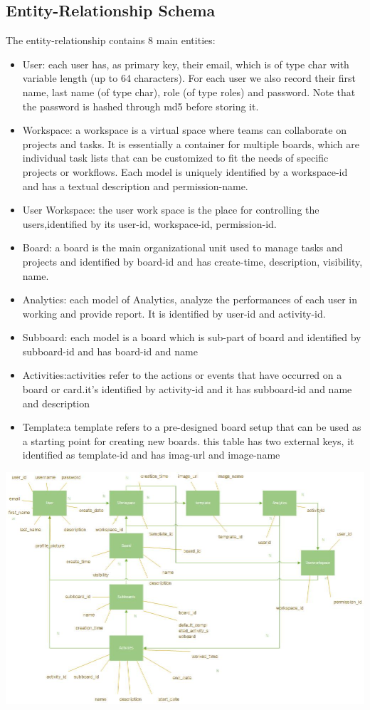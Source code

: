 \subsection{Entity-Relationship Schema}


\noindent The entity-relationship contains 8 main entities:
\begin{itemize}
    \item User: each user has, as primary key, their email, which is of type char with variable length (up to 64 characters). For each user we also record their first name, last name (of type char), role (of type roles) and password. Note that the password is hashed through md5 before storing it.
    \item Workspace: a workspace is a virtual space where teams can collaborate on projects and tasks. It is essentially a container for multiple boards, which are individual task lists that can be customized to fit the needs of specific projects or workflows. Each model is uniquely identified by a workspace-id and has a textual description and permission-name.
    \item User Workspace: the user work space is the place for controlling the users,identified by its user-id, workspace-id, permission-id.
    \item Board: a board is the main organizational unit used to manage tasks and projects and identified by board-id and has create-time, description, visibility, name.
    \item Analytics: each model of Analytics, analyze the performances of each user in working and provide report. It is identified by user-id and activity-id.
    \item Subboard: each model is a board which is sub-part of board and identified by subboard-id and has board-id and name 
    \item Activities:activities refer to the actions or events that have occurred on a board or card.it's identified by activity-id and it has subboard-id and name and description
    \item Template:a template refers to a pre-designed board setup that can be used as a starting point for creating new boards. this table has two external keys, it identified as template-id and has imag-url and image-name
\end{itemize}

\includegraphics[width=\columnwidth]{WA-workflix-HW1/images/ER-schma.jpg}

